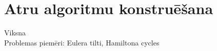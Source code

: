 \section{Atru algoritmu konstruēšana}
Viksna \\

Problemas piemēri: Eulera tilti, Hamiltona cycles

